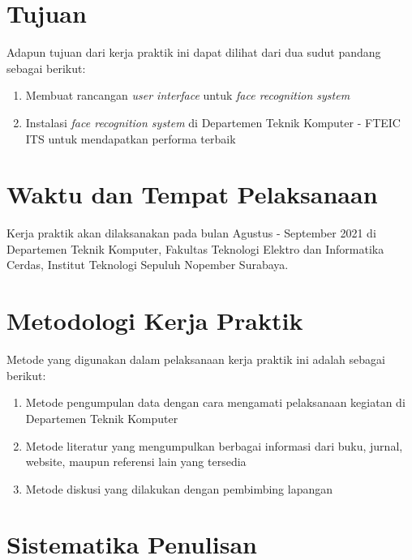 \section{Tujuan}

Adapun tujuan dari kerja praktik ini dapat dilihat dari dua sudut pandang sebagai berikut:

\begin{enumerate}[nolistsep]

  \item Membuat rancangan \textit{user interface} untuk \textit{face recognition system}

  \item Instalasi \textit{face recognition system} di Departemen Teknik Komputer - FTEIC ITS untuk mendapatkan performa terbaik

\end{enumerate}


\section{Waktu dan Tempat Pelaksanaan}

Kerja praktik akan dilaksanakan pada bulan Agustus - September 2021 di Departemen Teknik Komputer, Fakultas Teknologi Elektro dan Informatika Cerdas, Institut Teknologi Sepuluh Nopember Surabaya.

\section{Metodologi Kerja Praktik}

Metode yang digunakan dalam pelaksanaan kerja praktik ini adalah sebagai berikut:

\begin{enumerate}[nolistsep]

  \item Metode pengumpulan data dengan cara mengamati pelaksanaan kegiatan di Departemen Teknik Komputer

  \item Metode literatur yang mengumpulkan berbagai informasi dari buku, jurnal, website, maupun referensi lain yang tersedia

  \item Metode diskusi yang dilakukan dengan pembimbing lapangan

\end{enumerate}

\section{Sistematika Penulisan}

